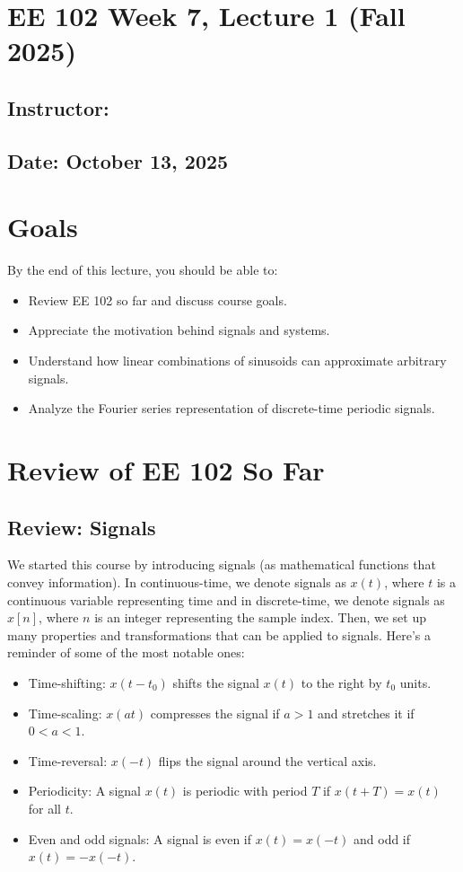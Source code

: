 \documentclass{ee102_notes}
\renewcommand{\releasedate}{October 13, 2025}
\begin{document}
\section*{EE 102 Week 7, Lecture 1 (Fall 2025)}
\subsection*{Instructor: \instructor}
\subsection*{Date: \releasedate}

\section{Goals}
By the end of this lecture, you should be able to:
\begin{itemize}
\item Review EE 102 so far and discuss course goals. 
\item Appreciate the motivation behind signals and systems. 
\item Understand how linear combinations of sinusoids can approximate arbitrary signals.
\item Analyze the Fourier series representation of discrete-time periodic signals.
\end{itemize}

\section{Review of EE 102 So Far}
\subsection{Review: Signals}
We started this course by introducing signals (as mathematical functions that convey information). In continuous-time, we denote signals as $x(t)$, where $t$ is a continuous variable representing time and in discrete-time, we denote signals as $x[n]$, where $n$ is an integer representing the sample index. Then, we set up many properties and transformations that can be applied to signals. Here's a reminder of some of the most notable ones:
\begin{itemize}
\item Time-shifting: $x(t - t_0)$ shifts the signal $x(t)$ to the right by $t_0$ units.
\item Time-scaling: $x(at)$ compresses the signal if $a > 1$ and stretches it if $0 < a < 1$.
\item Time-reversal: $x(-t)$ flips the signal around the vertical axis.
\item Periodicity: A signal $x(t)$ is periodic with period $T$ if $x(t + T) = x(t)$ for all $t$.
\item Even and odd signals: A signal is even if $x(t) = x(-t)$ and odd if $x(t) = -x(-t)$.
\end{itemize}
\end{document}
